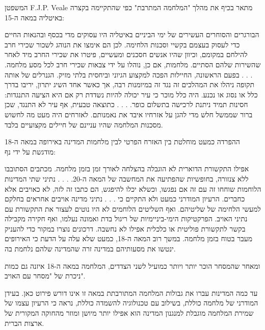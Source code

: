 \documentclass[12pt,oneside]{book}
\begin{document}
המשפטן F.J.P. Veale מתאר בכיף את מהלך "המלחמה המתרבת" כפי שהתקיימה בקצרה באיטליה במאה ה-15:

\begin{quoting}
הבורגרים והסוחרים העשירים של ימי הביניים באיטליה היו עסוקים מדי בכסף ובהנאות החיים כדי לעסוק בעצמם בקשיי וסכנות הלחימה. לכן הם אימצו את הנוהג לשכור שכירי חרב להילחם במקומם, וכיוון שהיו אנשים חסכנים ומעשיים, פיטרו את שכירי החרב מיד לאחר שהשירות שלהם הסתיים. מלחמות, אם כן, נוהלו על ידי צבאות שכירי חרב לכל מסע מלחמה. . . . בפעם הראשונה, החיילות הפכה למקצוע הגיוני וביחסית בלתי מזיק. הגנרלים של אותה תקופה ניהלו את המהלכים זה נגד זה במיומנות רבה, אך כאשר אחד השיג יתרון, יריבו בדרך כלל או נסוג או נכנע. היה כלל מוכר כי עיר יכולה להיות נשדדת רק אם היא הציעה התנגדות: חסינות תמיד ניתנת לרכישה בתשלום כופר. . . . כתוצאה טבעית, אף עיר לא התנגד, שכן ברור שממשל חלש מדי להגן על אזרחיו איבד את נאמנותם. לאזרחים היה מעט מה לחשוש מסכנות המלחמה שהיו עניינם של חיילים מקצועיים בלבד.
\end{quoting}

ההפרדה כמעט מוחלטת בין האזרח הפרטי לבין מלחמות המדינה באירופה במאה ה-18 מודגשת על ידי נף:

\begin{quoting}
אפילו התקשורת הדוארית לא הוגבלה בהצלחה לאורך זמן בזמן מלחמה. מכתבים הסתובבו ללא צנזורה, בחופשיות שהפתיעה את המחשבה של המאה ה-20. . . . נתיני שתי המדינות הלוחמות שוחחו זה עם זה אם נפגשו, וכשלא יכלו להיפגש, הם כתבו זה לזה, לא כאויבים אלא כחברים. הרעיון המודרני כמעט ולא התקיים כי . . . נתיני מדינה אויבים אחראים בחלקם למעשי הלחימה של שליטיהם. ואף השליטים הלוחמים לא היו נוטים לעצור את התקשורת עם נתיני האויב. הפרקטיקות הימי-ביניימיות של ריגול בדת ואמונה נעלמו, ואף חקירה מקבילה בקשר לתקשורת פוליטית או כלכלית אפילו לא נחשבה. דרכונים נוצרו במקור כדי להעניק מעבר בטוח בזמן מלחמה. במשך רוב המאה ה-18, כמעט שלא עלה על הדעת כי האירופים ינטשו את מסעותיהם במדינה זרה שהמדינה שלהם נלחמת בה.
\end{quoting}

ומאחר שהמסחר הוכר יותר ויותר כמועיל לשני הצדדים, המלחמה במאה ה-18 איזנה גם כמות ניכרת של "מסחר עם האויב".

עד כמה המדינות עברו את גבולות המלחמה המתורבתת במאה זו אינו דורש פירוט כאן. בעידן המודרני של מלחמה כוללת, בשילוב עם טכנולוגיה להשמדה כוללת, נראה כי הרעיון עצמו של שמירת המלחמה מוגבלת למנגנון המדינה הוא אפילו יותר מיושן ומוזר מהחוקה המקורית של ארצות הברית.
\end{document}

